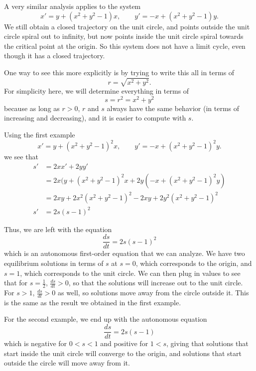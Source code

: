 \documentclass{ximera}
\begin{document}
A very similar analysis applies to the system
\begin{equation*}
    x' = y + {(x^2+y^2-1)} x, \qquad y' = -x + {(x^2+y^2-1)} y.
\end{equation*}
We still obtain a closed trajectory on the unit circle, and points outside the unit circle spiral out to infinity, but now points inside the unit circle spiral towards the critical point at the origin. So this system does not have a limit cycle, even though it has a closed trajectory.

One way to see this more explicitly is by trying to write this all in terms of 
\[ 
    r = \sqrt{x^2 + y^2}. 
\] 
For simplicity here, we will determine everything in terms of 
\[ 
    s = r^2 = x^2 + y^2 
\] 
because as long as $r > 0$, $r$ and $s$ always have the same behavior (in terms of increasing and decreasing), and it is easier to compute with $s$. 

Using the first example
\begin{equation*}
    x' = y + {(x^2+y^2-1)}^2 x, \qquad y' = -x + {(x^2+y^2-1)}^2 y.
\end{equation*}
we see that
\[ 
    \begin{split}
        s' &= 2xx' + 2yy' \\
        &= 2x(y + {(x^2+y^2-1)}^2 x + 2y(-x + {(x^2+y^2-1)}^2 y) \\
        &= 2xy + 2x^2(x^2 + y^2 - 1)^2 - 2xy + 2y^2(x^2 + y^2 - 1)^2 \\
        s' &= 2s(s-1)^2
    \end{split}
\]

Thus, we are left with the equation
\[ 
    \frac{ds}{dt} = 2s(s-1)^2 
\]
which is an autonomous first-order equation that we can analyze. We have two equilibrium solutions in terms of $s$ at $s=0$, which corresponds to the origin, and $s=1$, which corresponds to the unit circle. We can then plug in values to see that for $s = \frac{1}{2}$, $\frac{ds}{dt} > 0$, so that the solutions will increase out to the unit circle. For $s>1$, $\frac{ds}{dt} > 0$ as well, so solutions move away from the circle outside it. This is the same as the result we obtained in the first example.

For the second example, we end up with the autonomous equation
\[ 
    \frac{ds}{dt} = 2s(s-1) 
\] 
which is negative for $0 < s < 1$ and positive for $1 < s$, giving that solutions that start inside the unit circle will converge to the origin, and solutions that start outside the circle will move away from it.
\end{document}
